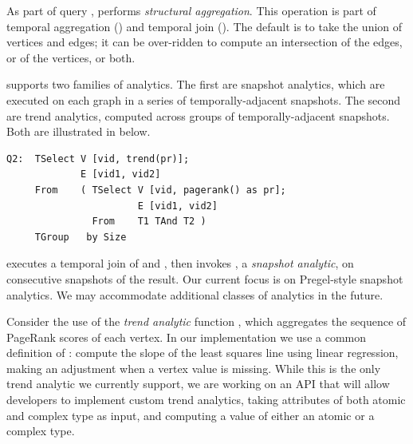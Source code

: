As part of query , \ql performs {\em structural
  aggregation}.  This operation is part of temporal aggregation
() and temporal join ().  The default is to
take the union of vertices and edges; it can be over-ridden to compute
an intersection of the edges, or of the vertices, or both.

\ql supports two families of analytics.  The first are snapshot
analytics, which are executed on each graph in a series of
temporally-adjacent snapshots.  The second are trend analytics,
computed across groups of temporally-adjacent snapshots.  Both are
illustrated in  below.

{\footnotesize
\begin{verbatim}
Q2:  TSelect V [vid, trend(pr)];
             E [vid1, vid2]  
     From    ( TSelect V [vid, pagerank() as pr];   
                       E [vid1, vid2]
               From    T1 TAnd T2 )
     TGroup   by Size
\end{verbatim}
}

 executes a temporal join of  and , then
invokes , a {\em snapshot analytic}, on consecutive
snapshots of the result.  Our current focus is on Pregel-style
snapshot analytics.  We may accommodate additional classes of
analytics in the future.

Consider the use of the {\em trend analytic} function
, which aggregates the sequence of PageRank scores of
each vertex.  In our implementation we use a common definition of
: compute the slope of the least squares line using
linear regression, making an adjustment when a vertex value is
missing.  While this is the only trend analytic we currently support,
we are working on an API that will allow developers to implement
custom trend analytics, taking attributes of both atomic and complex
type as input, and computing a value of either an atomic or a complex
type.


